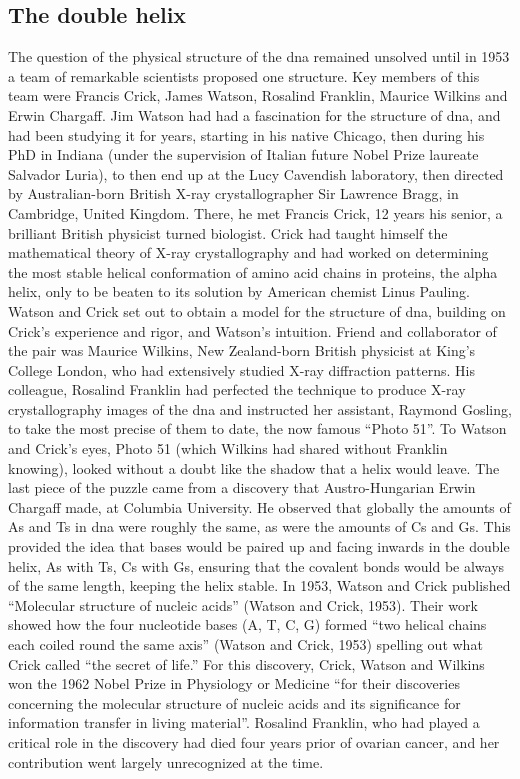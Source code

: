 \subsection{The double helix} %

The question of the physical structure of the \gls{dna} remained unsolved until in 1953 a team of remarkable scientists proposed one structure. 
Key members of this team were Francis Crick, James Watson, Rosalind Franklin, Maurice Wilkins and Erwin Chargaff. 
Jim Watson had had a fascination for the structure of \gls{dna}, and had been studying it for years, starting in his native Chicago, then during his PhD in Indiana (under the supervision of Italian future Nobel Prize laureate Salvador Luria), to then end up at the Lucy Cavendish laboratory, then directed by Australian-born British X-ray crystallographer Sir Lawrence Bragg, in Cambridge, United Kingdom. 
There, he met Francis Crick, 12 years his senior, a brilliant British physicist turned biologist. 
Crick had taught himself the mathematical theory of X-ray crystallography and had worked on determining the most stable helical conformation of amino acid chains in proteins, the alpha helix, only to be beaten to its solution by American chemist Linus Pauling. 
Watson and Crick set out to obtain a model for the structure of \gls{dna}, building on Crick’s experience and rigor, and Watson’s intuition. 
Friend and collaborator of the pair was Maurice Wilkins, New Zealand-born British physicist at King’s College London, who had extensively studied X-ray diffraction patterns. 
His colleague, Rosalind Franklin had perfected the technique to produce X-ray crystallography images of the \gls{dna} and instructed her assistant, Raymond Gosling, to take the most precise of them to date, the now famous “Photo 51”. 
To Watson and Crick’s eyes, Photo 51 (which Wilkins had shared without Franklin knowing), looked without a doubt like the shadow that a helix would leave. The last piece of the puzzle came from a discovery that Austro-Hungarian Erwin Chargaff made, at Columbia University. He observed that globally the amounts of As and Ts in \gls{dna} were roughly the same, as were the amounts of Cs and Gs. 
This provided the idea that bases would be paired up and facing inwards in the double helix, As with Ts, Cs with Gs, ensuring that the covalent bonds would be always of the same length, keeping the helix stable. 
In 1953, Watson and Crick published “Molecular structure of nucleic acids” (Watson and Crick, 1953). 
Their work showed how the four nucleotide bases (A, T, C, G) formed “two helical chains each coiled round the same axis” (Watson and Crick, 1953) spelling out what Crick called “the secret of life.” 
For this discovery, Crick, Watson and Wilkins won the 1962 Nobel Prize in Physiology or Medicine “for their discoveries concerning the molecular structure of nucleic acids and its significance for information transfer in living material”. 
Rosalind Franklin, who had played a critical role in the discovery had died four years prior of ovarian cancer, and her contribution went largely unrecognized at the time.


